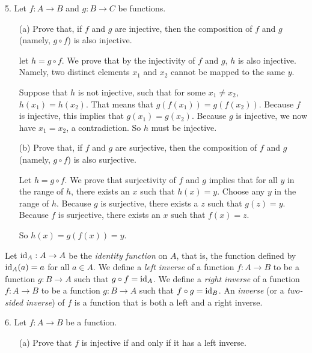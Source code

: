 \documentclass[12pt]{article} %
\newcommand{\id}{{\rm id}}
\begin{document}
\begin{flushleft}
5.  Let $f: A \rightarrow B$ and $g: B \rightarrow C$ be functions.
\begin{itemize}
 \item[(a)] Prove that, if $f$ and $g$ are injective, then the composition of $f$ and $g$ (namely, $g \circ f$) is also injective.

  let $h = g\circ f$. We prove that by the injectivity of $f$ and $g$, $h$ is also injective. Namely, two distinct elements $x_1$ and $x_2$ cannot be mapped to the same $y$. 

  Suppose that $h$ is not injective, such that for some $x_1\neq x_2$, $h(x_1) = h(x_2)$. That means that $g(f(x_1)) = g(f(x_2))$. Because $f$ is injective, this implies that $g(x_1) = g(x_2)$. Because $g$ is injective, we now have $x_1 = x_2$, a contradiction. So $h$ must be injective.
 
 \item[(b)] Prove that, if $f$ and $g$ are surjective, then the composition of $f$ and $g$ (namely, $g \circ f$) is also surjective.

  Let $h = g \circ f$. We prove that surjectivity of $f$ and $g$ implies that for all $y$ in the range of $h$, there exists an $x$ such that $h(x) = y$. Choose any $y$ in the range of $h$. Because $g$ is surjective, there exists a $z$ such that $g(z) = y$. Because $f$ is surjective, there exists an $x$ such that $f(x) = z$.

  So $h(x) = g(f(x)) = y$.
\end{itemize}
\vspace{1cm}

Let $\id_A:A \rightarrow A$ be the \textit{identity function} on $A$, that is, the function defined by $\id_A(a) = a$ for all $a \in A$.  We define a \textit{left inverse} of a function $f: A \rightarrow B$ to be a function $g: B \rightarrow A$ such that $g \circ f = \id_A$.  We define a \textit{right inverse} of a function $f: A \rightarrow B$ to be a function $g: B \rightarrow A$ such that $f \circ g = \id_B$.  An \textit{inverse} (or a \textit{two-sided inverse}) of $f$ is a function that is both a left and a right inverse.\\

\vspace{0.5cm}

6.  Let $f: A \rightarrow B$ be a function.
\begin{itemize}
 \item[(a)] Prove that $f$ is injective if and only if it has a left inverse.


\end{itemize}
\end{flushleft}
\end{document}
